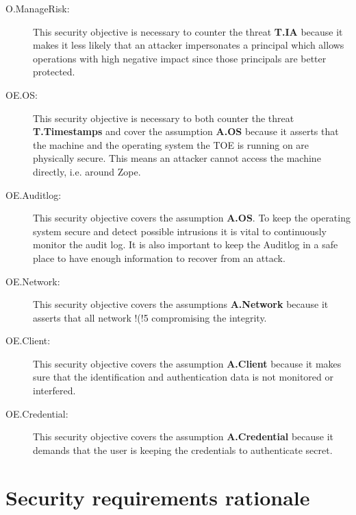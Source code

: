 \documentclass[12pt,english]{scrbook}
\begin{document}
\begin{description}
  \item[O.ManageRisk:] This security objective is necessary to counter the
  threat \textbf{T.IA} because it makes it less likely that an attacker
  impersonates a principal which allows operations with high negative impact
  since those principals are better protected.

  \item[OE.OS:] This security objective is necessary to both counter the
  threat \textbf{T.Timestamps} and cover the assumption \textbf{A.OS} because
  it asserts that the machine and the operating system the TOE is running on
  are physically secure. This means an attacker cannot access the machine
  directly, i.e. around Zope.

  \item[OE.Auditlog:] This security objective covers the assumption
  \textbf{A.OS}. To keep the operating system secure and detect possible
  intrusions it is vital to continuously monitor the audit log. It is also
  important to keep the Auditlog in a safe place to have enough information to
  recover from an attack.

  \item[OE.Network:] This security objective covers the assumptions
  \textbf{A.Network} because it asserts that all
  network !(!5
  compromising the integrity.

  \item[OE.Client:] This security objective covers the assumption
  \textbf{A.Client} because it makes sure that the identification and
  authentication data is not monitored or interfered.

  \item[OE.Credential:] This security objective covers the assumption
  \textbf{A.Credential} because it demands that the user is keeping the
  credentials to authenticate secret.
  
\end{description}



\section{Security requirements rationale}
\end{document}
